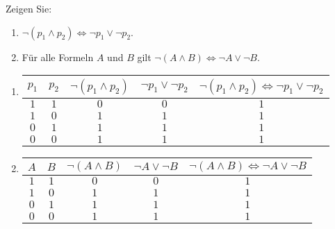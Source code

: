 
\begin{exercise}[18]

Zeigen Sie:

\begin{enumerate}[label = \alph*]
    \item $\neg (p_1 \land p_2) \Leftrightarrow \neg p_1 \lor \neg p_2$.
    \item Für alle Formeln $A$ und $B$ gilt $\neg (A \land B) \Leftrightarrow \neg A \lor \neg B$.
\end{enumerate}

\end{exercise}


\begin{solution}
\phantom{}
\begin{enumerate}[label = \alph*]
    \item \begin{tabular}{|c|c|c|c|c|}
    \hline
    $p_1$ & $p_2$ & $\neg (p_1 \land p_2)$ & $\neg p_1 \lor \neg p_2$ & $\neg (p_1 \land p_2) \Leftrightarrow \neg p_1 \lor \neg p_2$ \\
    \hline
    $1$ & $1$ & $0$ & $0$ & $1$\\
    \hline
    $1$ & $0$ & $1$ & $1$ & $1$\\
    \hline
    $0$ & $1$ & $1$ & $1$ & $1$\\
    \hline
    $0$ & $0$ & $1$ & $1$ & $1$\\
    \hline
    \end{tabular}
    \item \begin{tabular}{|c|c|c|c|c|}
    \hline
    $A$ & $B$ & $\neg (A \land B)$ & $\neg A \lor \neg B$ & $\neg (A \land B) \Leftrightarrow \neg A \lor \neg B$ \\
    \hline
    $1$ & $1$ & $0$ & $0$ & $1$\\
    \hline
    $1$ & $0$ & $1$ & $1$ & $1$\\
    \hline
    $0$ & $1$ & $1$ & $1$ & $1$\\
    \hline
    $0$ & $0$ & $1$ & $1$ & $1$\\
    \hline
    \end{tabular}
\end{enumerate}

\end{solution}

